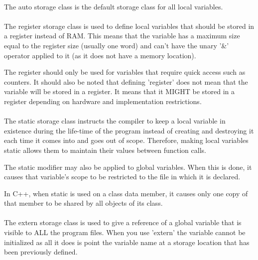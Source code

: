 \documentclass[10pt,a4paper]{scrartcl}
\begin{document}
\begin{multicols*}{2}
\paragraph{}

The auto storage class is the default storage class for all local variables.

\paragraph{}

The register storage class is used to define local variables that should be stored in a register instead of RAM. This means that the variable has a maximum size equal to the register size (usually one word) and can't have the unary '\&' operator applied to it (as it does not have a memory location).

The register should only be used for variables that require quick access such as counters. It should also be noted that defining 'register' does not mean that the variable will be stored in a register. It means that it MIGHT be stored in a register depending on hardware and implementation restrictions.

\paragraph{}

The static storage class instructs the compiler to keep a local variable in existence during the life-time of the program instead of creating and destroying it each time it comes into and goes out of scope. Therefore, making local variables static allows them to maintain their values between function calls.

The static modifier may also be applied to global variables. When this is done, it causes that variable's scope to be restricted to the file in which it is declared.

In C++, when static is used on a class data member, it causes only one copy of that member to be shared by all objects of its class.

\paragraph{}

The extern storage class is used to give a reference of a global variable that is visible to ALL the program files. When you use 'extern' the variable cannot be initialized as all it does is point the variable name at a storage location that has been previously defined.


\end{multicols*}
\end{document}

